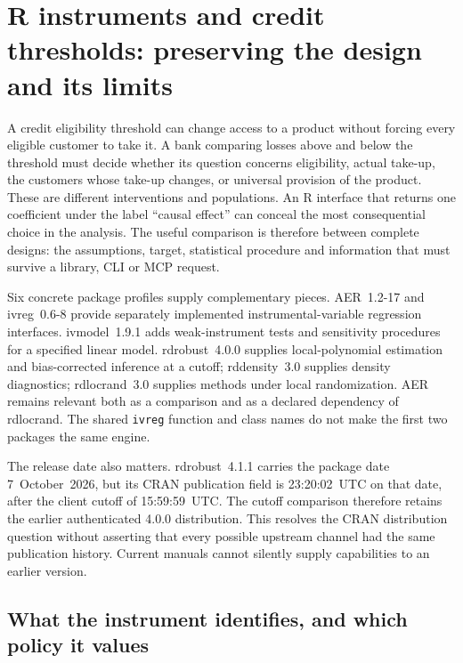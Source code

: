 \section{R instruments and credit thresholds: preserving the design and its limits}
\label{exec22:riv-scope}

A credit eligibility threshold can change access to a product without forcing
every eligible customer to take it. A bank comparing losses above and below the
threshold must decide whether its question concerns eligibility, actual take-up,
the customers whose take-up changes, or universal provision of the product. These
are different interventions and populations. An R interface that returns one
coefficient under the label ``causal effect'' can conceal the most consequential
choice in the analysis. The useful comparison is therefore between complete
designs: the assumptions, target, statistical procedure and information that must
survive a library, CLI or MCP request.

Six concrete package profiles supply complementary pieces. AER~1.2-17 and
ivreg~0.6-8 provide separately implemented instrumental-variable regression
interfaces. ivmodel~1.9.1 adds weak-instrument tests and sensitivity procedures
for a specified linear model. rdrobust~4.0.0 supplies local-polynomial estimation
and bias-corrected inference at a cutoff; rddensity~3.0 supplies density diagnostics;
rdlocrand~3.0 supplies methods under local randomization. AER remains relevant
both as a comparison and as a declared dependency of rdlocrand. The shared
\texttt{ivreg} function and class names do not make the first two packages the
same engine.\citep{exec22_riv_aer,exec22_riv_ivreg,exec22_riv_ivmodel,
exec22_riv_rdrobust,exec22_riv_rddensity,exec22_riv_rdlocrand}

The release date also matters. rdrobust~4.1.1 carries the package date
7~October~2026, but its CRAN publication field is 23:20:02~UTC on that date,
after the client cutoff of 15:59:59~UTC. The cutoff comparison therefore retains
the earlier authenticated 4.0.0 distribution. This resolves the CRAN distribution
question without asserting that every possible upstream channel had the same
publication history. Current manuals cannot silently supply capabilities to an
earlier version.\citep{exec22_riv_rdrobust}

\subsection{What the instrument identifies, and which policy it values}
\label{exec22:riv-target}

